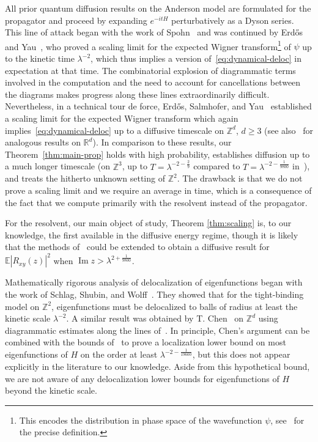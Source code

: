 \documentclass[11pt]{amsart}
\def\Real{{\mathbb R}}
\def\bbZ{{\mathbb Z}}
\def\Expec{{\mathbb E}}
\newcommand{\Impt}{\operatorname*{Im}}
\numberwithin{equation}{section}
\numberwithin{theorem}{section}
\begin{document}
All prior quantum diffusion results on the Anderson model are formulated for the propagator and proceed by expanding $e^{-itH}$ perturbatively as a Dyson series.
This line of attack began with the
work of Spohn~\cite{spohn1977derivation} and was continued by Erd\H{o}s and Yau~\cite{EYkinetic}, who proved a scaling limit for the expected Wigner  transform\footnote{This encodes the distribution in phase space of the wavefunction $\psi$, see~\cite{EYkinetic} for the precise definition.} of $\psi$
up to the kinetic time $\lambda^{-2}$, which thus implies a version of~\eqref{eq:dynamical-deloc} in expectation at that time.  The combinatorial explosion of diagrammatic terms involved in the computation and the need to account for cancellations between the diagrams makes progress along these lines extraordinarily difficult.  Nevertheless, in a technical tour de force, Erd{\H{o}}s, Salmhofer, and Yau~\cite{ESYAnderson, ESYrecollision} established a scaling limit for the expected Wigner transform which again implies~\eqref{eq:dynamical-deloc}  up to a diffusive timescale on $\bbZ^d$, $d\geq 3$ (see also~\cite{ESYRSE,hernandez2024quantum} for analogous results on $\Real^d$).
In comparison to these results, our Theorem~\ref{thm:main-prop} holds with high probability, establishes diffusion up to a much longer timescale (on $\bbZ^3$,  up to $T=\lambda^{-2-\frac29}$ compared to $T=\lambda^{-2-\frac{1}{9800}}$ in~\cite{ESYAnderson}), and treats the hitherto unknown setting of $\bbZ^2$.  The drawback is that we do not prove a scaling limit and we require an average in time, which is a consequence of the fact that we compute primarily with the resolvent instead of the propagator.

For the resolvent, our main object of study, Theorem \ref{thm:scaling} is, to our knowledge, the first available in the diffusive energy regime,
though it is likely that the methods of~\cite{ESYAnderson} could be extended to obtain a diffusive result for $\Expec |R_{xy}(z)|^2$ when $\Impt z>\lambda^{2+\frac{1}{9800}}$.


Mathematically rigorous analysis of delocalization of eigenfunctions began with
the work of Schlag, Shubin, and Wolff~\cite{SSW}.  They showed that for the tight-binding
model on $\bbZ^2$, eigenfunctions must be delocalized to balls of radius at least the kinetic scale $\lambda^{-2}$.  A similar result was obtained by T. Chen~\cite{Chen} on $\bbZ^d$ using diagrammatic estimates along the lines of~\cite{EYkinetic}.  In principle, Chen's argument can be combined with the bounds of~\cite{ESYAnderson}
to prove a localization lower bound on most eigenfunctions of $H$ on the order at least $\lambda^{-2-\frac{1}{19600}}$, but
this does not appear explicitly in the literature to our knowledge.  Aside from this hypothetical bound,
we are not aware of any delocalization lower bounds for eigenfunctions of $H$ beyond the kinetic scale.
\end{document}
